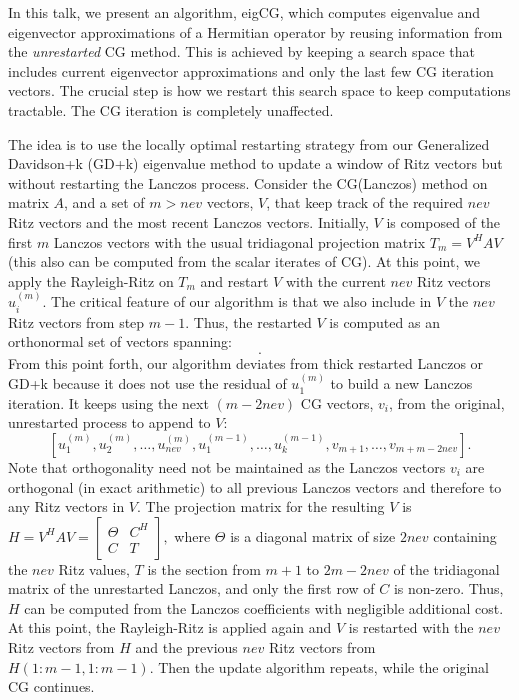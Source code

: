 \documentclass{report}
\begin{document}
In this talk, we present an algorithm, eigCG, which computes eigenvalue and
eigenvector approximations of a Hermitian operator by reusing information
from the {\em unrestarted} CG method.
This is achieved by keeping a search space that includes current eigenvector
approximations and only the last few CG iteration vectors.
The crucial step is how we restart this search space to keep computations
tractable.
The CG iteration is completely unaffected.


The idea is to use the locally optimal restarting strategy from our
Generalized Davidson+k (GD+k) eigenvalue method to update a window of Ritz
vectors {\rm but without restarting the Lanczos process.}
Consider the CG(Lanczos) method on matrix $A$, and a set of $m>nev$ vectors,
$V$, that keep track of the required $nev$ Ritz vectors and the most recent
Lanczos vectors.
Initially, $V$ is composed of the first $m$ Lanczos vectors with the usual
tridiagonal projection matrix $T_m = V^HAV$ (this also can be computed
from the scalar iterates of CG).
At this point, we apply the Rayleigh-Ritz on $T_m$ and restart $V$ with the
current $nev$ Ritz vectors $u_i^{(m)}$.
The critical feature of our algorithm is that we also include in $V$
the $nev$ Ritz vectors from step $m-1$.
Thus, the restarted $V$ is computed as an orthonormal set of vectors spanning:
\begin{equation}
[u_1^{(m)}, u_2^{(m)}, \ldots , u_{nev}^{(m)},
u_1^{(m-1)}, \ldots ,u_k^{(m-1)} ].
\label{eq:restartedV}
\end{equation}
From this point forth, our algorithm deviates from thick restarted Lanczos or
GD+k because it does not use the residual of $u_1^{(m)}$ to build
a new Lanczos iteration.
It keeps using the next $(m-2nev)$ CG vectors, $v_i$, from the original,
unrestarted process to append to $V$:
$$
[u_1^{(m)}, u_2^{(m)}, \ldots , u_{nev}^{(m)},
u_1^{(m-1)}, \ldots ,u_k^{(m-1)},
v_{m+1}, \ldots ,v_{m+m-2nev} ].$$
Note that orthogonality need not be maintained as the Lanczos vectors $v_i$
are orthogonal (in exact arithmetic) to all previous Lanczos vectors
and therefore to any Ritz vectors in $V$.
The projection matrix for the resulting $V$ is
$H = V^HAV =
\left[
\begin{array}{ccl}
\Theta & C^H\\
C & T
\end{array}
\right],
$
where $\Theta$ is a diagonal matrix of size $2nev$ containing the $nev$
Ritz values, $T$ is the section from $m+1$ to $2m-2nev$ of the
tridiagonal matrix of the unrestarted Lanczos, and only the first row
of $C$ is non-zero.
Thus, $H$ can be computed from the Lanczos coefficients with negligible
additional cost.
At this point, the Rayleigh-Ritz is applied again and $V$ is restarted
with the $nev$ Ritz vectors from $H$ and the previous $nev$ Ritz vectors
from $H(1:m-1,1:m-1)$.
Then the update algorithm repeats, while the original CG continues.
\end{document}
